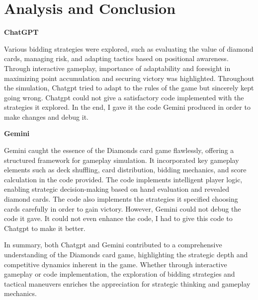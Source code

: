 \documentclass[11pt]{article}
\begin{document}
\section{Analysis and Conclusion}

\textbf{ChatGPT}

Various bidding strategies were explored, such as evaluating the value of diamond cards, managing risk, and adapting tactics based on positional awareness. Through interactive gameplay, importance of adaptability and foresight in maximizing point accumulation and securing victory was highlighted. Throughout the simulation, Chatgpt tried to adapt to the rules of the game but sincerely kept going wrong. Chatgpt could not give a satisfactory code implemented with the strategies it explored. In the end, I gave it the code Gemini produced in order to make changes and debug it.
\vspace{10pt}

\textbf{Gemini}

Gemini caught the essence of the Diamonds card game flawlessly, offering a structured framework for gameplay simulation. It incorporated key gameplay elements such as deck shuffling, card distribution, bidding mechanics, and score calculation in the code provided. The code implements intelligent player logic, enabling strategic decision-making based on hand evaluation and revealed diamond cards. The code also implements the strategies it specified choosing cards carefully in order to gain victory. However, Gemini could not debug the code it gave. It could not even enhance the code, I had to give this code to Chatgpt to make it better.
\vspace{10pt}

In summary, both Chatgpt and Gemini contributed to a comprehensive understanding of the Diamonds card game, highlighting the strategic depth and competitive dynamics inherent in the game. Whether through interactive gameplay or code implementation, the exploration of bidding strategies and tactical maneuvers enriches the appreciation for strategic thinking and gameplay mechanics.
\end{document}

